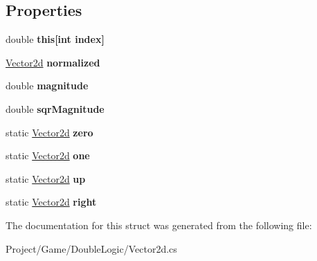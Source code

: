 \subsection*{Properties}
\begin{DoxyCompactItemize}
\item 
\mbox{\label{struct_unity_engine_1_1_vector2d_a4b9f5ceed4df5579d77bc58e5438696f}} 
double {\bfseries this\mbox{[}int index\mbox{]}}
\item 
\mbox{\label{struct_unity_engine_1_1_vector2d_a492999ea891d5f6e75f09b329e35a60d}} 
\hyperlink{struct_unity_engine_1_1_vector2d}{Vector2d} {\bfseries normalized}
\item 
\mbox{\label{struct_unity_engine_1_1_vector2d_a7ea59fa974fb365eb2892878b207767a}} 
double {\bfseries magnitude}
\item 
\mbox{\label{struct_unity_engine_1_1_vector2d_a3c4796bbf71edd26f246e4fca38799d2}} 
double {\bfseries sqr\+Magnitude}
\item 
\mbox{\label{struct_unity_engine_1_1_vector2d_a57cc55a0bda185d893c26e8645c17fe4}} 
static \hyperlink{struct_unity_engine_1_1_vector2d}{Vector2d} {\bfseries zero}
\item 
\mbox{\label{struct_unity_engine_1_1_vector2d_a50114eecef4bf4863037aa91103d5bf9}} 
static \hyperlink{struct_unity_engine_1_1_vector2d}{Vector2d} {\bfseries one}
\item 
\mbox{\label{struct_unity_engine_1_1_vector2d_a00ee365d7d1fff1d5be6586136a56950}} 
static \hyperlink{struct_unity_engine_1_1_vector2d}{Vector2d} {\bfseries up}
\item 
\mbox{\label{struct_unity_engine_1_1_vector2d_aa4b5fb4bdc71a213383f138ac1eda814}} 
static \hyperlink{struct_unity_engine_1_1_vector2d}{Vector2d} {\bfseries right}
\end{DoxyCompactItemize}


The documentation for this struct was generated from the following file\+:\begin{DoxyCompactItemize}
\item 
Project/\+Game/\+Double\+Logic/Vector2d.\+cs\end{DoxyCompactItemize}
